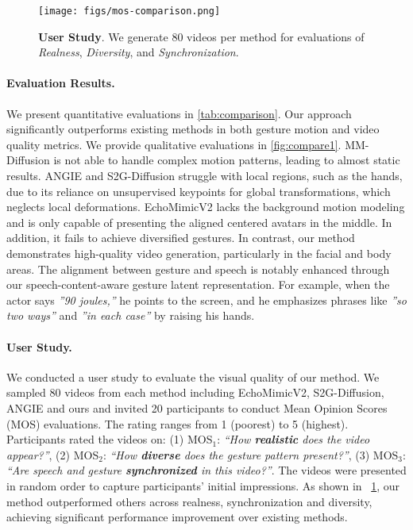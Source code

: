 \begin{figure}[thb]
\centering
\texttt{[image: figs/mos-comparison.png]}
\vspace{-0.5cm}
\caption{\textbf{User Study}. We generate 80 videos per method for evaluations of \textit{Realness}, \textit{Diversity}, and \textit{Synchronization}.}
 \vspace{-0.4cm}
\label{fig:user-study}
\end{figure}







\vspace{-0.2cm}
\paragraph{Evaluation Results.}
We present quantitative evaluations in \cref{tab:comparison}. Our approach significantly outperforms existing methods in both gesture motion and video quality metrics. We provide qualitative evaluations in \cref{fig:compare1}. MM-Diffusion is not able to handle complex motion patterns, leading to almost static results. ANGIE and S2G-Diffusion struggle with local regions, such as the hands, due to its reliance on unsupervised keypoints for global transformations, which neglects local deformations. EchoMimicV2 lacks the background motion modeling and is only capable of presenting the aligned centered avatars in the middle. In addition, it fails to achieve diversified gestures. In contrast, our method demonstrates high-quality video generation, particularly in the facial and body areas. The alignment between gesture and speech is notably enhanced through our speech-content-aware gesture latent representation. For example, when the actor says \textit{”90 joules,”} he points to the screen, and he emphasizes phrases like \textit{”so two ways”} and \textit{”in each case”} by raising his hands.




\vspace{-0.15cm}
\paragraph{User Study.}
We conducted a user study to evaluate the visual quality of our method. We sampled 80 videos from each method including EchoMimicV2, S2G-Diffusion, ANGIE and ours and invited 20 participants to conduct Mean Opinion Scores (MOS) evaluations. The rating ranges from 1 (poorest) to 5 (highest). Participants rated the videos on: (1) MOS$_1$: \textit{“How \textbf{realistic} does the video appear?”}, (2) MOS$_2$: \textit{“How \textbf{diverse} does the gesture pattern present?”}, (3) MOS$_3$: \textit{“Are speech and gesture \textbf{synchronized} in this video?”}. The videos were presented in random order to capture participants’ initial impressions. As shown in ~\cref{fig:user-study}, our method outperformed others across realness, synchronization and diversity, achieving significant performance improvement over existing methods. 



